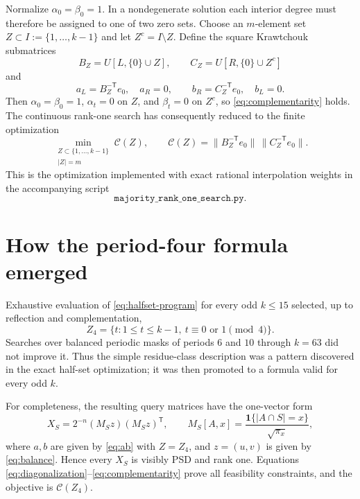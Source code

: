 \documentclass[11pt]{article}
\newcommand{\1}{\mathbf 1}
\newcommand{\norm}[1]{\lVert#1\rVert}
\begin{document}
Normalize $\alpha_0=\beta_0=1$.  In a nondegenerate solution each interior
degree must therefore be assigned to one of two zero sets.  Choose an
$m$-element set $Z\subset I:=\{1,\ldots,k-1\}$ and let $Z^c=I\setminus Z$.
Define the square Krawtchouk submatrices
\[
 B_Z=U[L,\{0\}\cup Z],\qquad
 C_Z=U[R,\{0\}\cup Z^c]
\]
and
\begin{equation}
 a_L=B_Z^{-\mathsf T}e_0,\quad a_R=0,\qquad
 b_R=C_Z^{-\mathsf T}e_0,\quad b_L=0.                  \label{eq:ab}
\end{equation}
Then $\alpha_0=\beta_0=1$, $\alpha_t=0$ on $Z$, and $\beta_t=0$ on
$Z^c$, so \eqref{eq:complementarity} holds.  The continuous rank-one search
has consequently reduced to the finite optimization
\begin{equation}
 \boxed{
 \min_{\substack{Z\subset\{1,\ldots,k-1\}\\|Z|=m}}
 \mathcal C(Z),\qquad
 \mathcal C(Z)=\norm{B_Z^{-\mathsf T}e_0}\,
                \norm{C_Z^{-\mathsf T}e_0}.}           \tag{H$_k$}\label{eq:halfset-program}
\end{equation}
This is the optimization implemented with exact rational interpolation
weights in the accompanying script
\[
 \texttt{majority\_rank\_one\_search.py}.
\]

\section{How the period-four formula emerged}

Exhaustive evaluation of \eqref{eq:halfset-program} for every odd
$k\le15$ selected, up to reflection and complementation,
\begin{equation}
 \boxed{Z_4=\{t:1\le t\le k-1,\ t\equiv0\text{ or }1\pmod4\}.}             \label{eq:period4}
\end{equation}
Searches over balanced periodic masks of periods $6$ and $10$ through
$k=63$ did not improve it.  Thus the simple residue-class description was a
pattern discovered in the exact half-set optimization; it was then promoted
to a formula valid for every odd $k$.

For completeness, the resulting query matrices have the one-vector form
\begin{equation}
 \boxed{X_S=2^{-n}(M_Sz)(M_Sz)^{\mathsf T},\qquad
 M_S[A,x]=\frac{\1\{|A\cap S|=x\}}{\sqrt{\pi_x}},}      \label{eq:XS}
\end{equation}
where $a,b$ are given by \eqref{eq:ab} with $Z=Z_4$, and $z=(u,v)$ is
given by \eqref{eq:balance}.  Hence every $X_S$ is visibly PSD and rank one.
Equations \eqref{eq:diagonalization}--\eqref{eq:complementarity} prove all
feasibility constraints, and the objective is $\mathcal C(Z_4)$.
\end{document}
